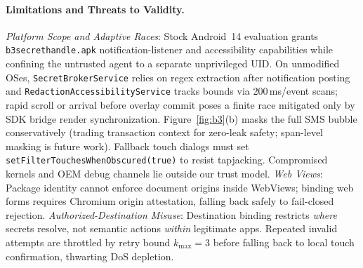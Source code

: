 \paragraph{Limitations and Threats to Validity.}
\label{sec:limitations}
\emph{Platform Scope and Adaptive Races}: Stock Android~14 evaluation grants \texttt{b3secrethandle.apk} notification-listener and accessibility capabilities while confining the untrusted agent to a separate unprivileged UID. On unmodified OSes, \texttt{SecretBrokerService} relies on regex extraction after notification posting and \texttt{RedactionAccessibilityService} tracks bounds via 200\,ms/event scans; rapid scroll or arrival before overlay commit poses a finite race mitigated only by SDK bridge render synchronization. Figure~\ref{fig:b3}(b) masks the full SMS bubble conservatively (trading transaction context for zero-leak safety; span-level masking is future work). Fallback touch dialogs must set \texttt{setFilterTouchesWhenObscured(true)} to resist tapjacking. Compromised kernels and OEM debug channels lie outside our trust model.
\emph{Web Views}: Package identity cannot enforce document origins inside WebViews; binding web forms requires Chromium origin attestation, falling back safely to fail-closed rejection.
\emph{Authorized-Destination Misuse}: Destination binding restricts \emph{where} secrets resolve, not semantic actions \emph{within} legitimate apps. Repeated invalid attempts are throttled by retry bound $k_{\max}=3$ before falling back to local touch confirmation, thwarting DoS depletion.


